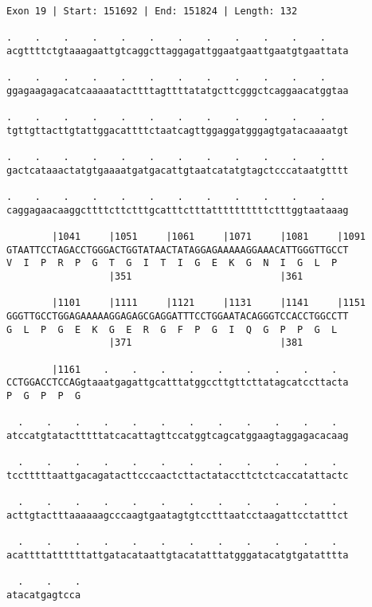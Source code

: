 \documentclass{article}
\begin{document}
\begin{Verbatim}[fontfamily=courier]
Exon 19 | Start: 151692 | End: 151824 | Length: 132

.    .    .    .    .    .    .    .    .    .    .    .    
acgttttctgtaaagaattgtcaggcttaggagattggaatgaattgaatgtgaattata

.    .    .    .    .    .    .    .    .    .    .    .    
ggagaagagacatcaaaaatacttttagttttatatgcttcgggctcaggaacatggtaa

.    .    .    .    .    .    .    .    .    .    .    .    
tgttgttacttgtattggacattttctaatcagttggaggatgggagtgatacaaaatgt

.    .    .    .    .    .    .    .    .    .    .    .    
gactcataaactatgtgaaaatgatgacattgtaatcatatgtagctcccataatgtttt

.    .    .    .    .    .    .    .    .    .    .    .    
caggagaacaaggcttttcttctttgcatttctttattttttttttctttggtaataaag

        |1041     |1051     |1061     |1071     |1081     |1091
GTAATTCCTAGACCTGGGACTGGTATAACTATAGGAGAAAAAGGAAACATTGGGTTGCCT
V  I  P  R  P  G  T  G  I  T  I  G  E  K  G  N  I  G  L  P  
                  |351                          |361        

        |1101     |1111     |1121     |1131     |1141     |1151
GGGTTGCCTGGAGAAAAAGGAGAGCGAGGATTTCCTGGAATACAGGGTCCACCTGGCCTT
G  L  P  G  E  K  G  E  R  G  F  P  G  I  Q  G  P  P  G  L  
                  |371                          |381        

        |1161    .    .    .    .    .    .    .    .    .  
CCTGGACCTCCAGgtaaatgagattgcatttatggccttgttcttatagcatccttacta
P  G  P  P  G                                               

  .    .    .    .    .    .    .    .    .    .    .    .  
atccatgtatactttttatcacattagttccatggtcagcatggaagtaggagacacaag

  .    .    .    .    .    .    .    .    .    .    .    .  
tcctttttaattgacagatacttcccaactcttactataccttctctcaccatattactc

  .    .    .    .    .    .    .    .    .    .    .    .  
acttgtactttaaaaaagcccaagtgaatagtgtcctttaatcctaagattcctatttct

  .    .    .    .    .    .    .    .    .    .    .    .  
acattttattttttattgatacataattgtacatatttatgggatacatgtgatatttta

  .    .    .
atacatgagtcca
\end{Verbatim}
\newpage
\end{document}
